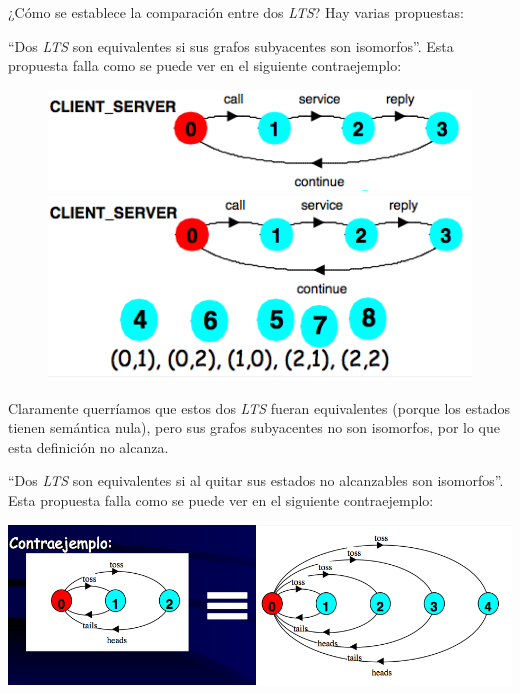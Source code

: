 \documentclass[]{article}
\begin{document}
¿Cómo se establece la comparación entre dos \textit{LTS}? Hay varias propuestas:

``Dos \textit{LTS} son equivalentes si sus grafos subyacentes son isomorfos''. Esta propuesta falla como se puede ver en el siguiente contraejemplo:
\begin{figure}[htb]
 \begin{center}
   \leavevmode
   \includegraphics[scale=0.5]{Isom1.png}
   \includegraphics[scale=0.5]{Isom2.png}
 \end{center}
\end{figure}

Claramente querríamos que estos dos \textit{LTS} fueran equivalentes (porque los estados tienen semántica nula), pero sus grafos subyacentes no son isomorfos, por lo que esta definición no alcanza.

``Dos \textit{LTS} son equivalentes si al quitar sus estados no alcanzables son isomorfos''. Esta propuesta falla como se puede ver en el siguiente contraejemplo:
\begin{center}
	\includegraphics[scale=0.5]{Isomor.png}
\end{center}
\end{document}
